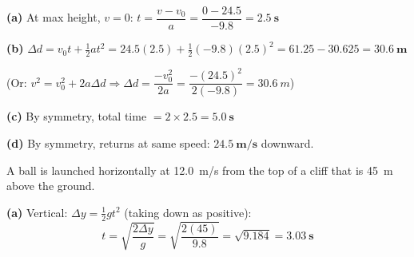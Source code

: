 \documentclass[addpoints]{exam}
\begin{document}
\begin{questions}
\begin{solution}[9cm]
\textbf{(a)} At max height, $v = 0$:\quad
$t = \dfrac{v - v_0}{a} = \dfrac{0 - 24.5}{-9.8} = \mathbf{\SI{2.5}{s}}$

\textbf{(b)} $\Delta d = v_0 t + \tfrac{1}{2}at^2 = 24.5(2.5) + \tfrac{1}{2}(-9.8)(2.5)^2
= 61.25 - 30.625 = \mathbf{\SI{30.6}{m}}$

(Or: $v^2 = v_0^2 + 2a\Delta d \Rightarrow \Delta d = \dfrac{-v_0^2}{2a} = \dfrac{-(24.5)^2}{2(-9.8)} = \SI{30.6}{m}$)

\textbf{(c)} By symmetry, total time $= 2 \times 2.5 = \mathbf{\SI{5.0}{s}}$

\textbf{(d)} By symmetry, returns at same speed: $\mathbf{\SI{24.5}{m/s}}$ downward.
\end{solution}

\question A ball is launched horizontally at \SI{12.0}{m/s} from the top of a cliff that is
\SI{45}{m} above the ground.
\begin{solution}[9cm]
\textbf{(a)} Vertical: $\Delta y = \tfrac{1}{2}gt^2$ (taking down as positive):
\[
t = \sqrt{\frac{2\Delta y}{g}} = \sqrt{\frac{2(45)}{9.8}} = \sqrt{9.184} = \mathbf{\SI{3.03}{s}}
\]


\end{solution}
\end{questions}
\end{document}
